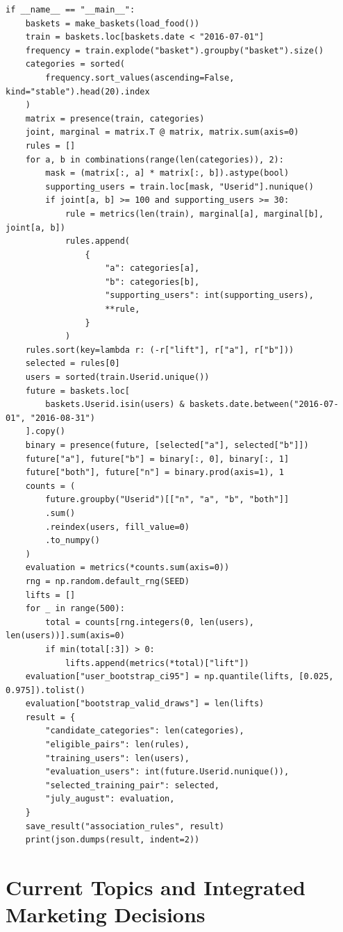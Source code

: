 \begin{Verbatim}[breaklines,breakanywhere,fontsize=\small]
if __name__ == "__main__":
    baskets = make_baskets(load_food())
    train = baskets.loc[baskets.date < "2016-07-01"]
    frequency = train.explode("basket").groupby("basket").size()
    categories = sorted(
        frequency.sort_values(ascending=False, kind="stable").head(20).index
    )
    matrix = presence(train, categories)
    joint, marginal = matrix.T @ matrix, matrix.sum(axis=0)
    rules = []
    for a, b in combinations(range(len(categories)), 2):
        mask = (matrix[:, a] * matrix[:, b]).astype(bool)
        supporting_users = train.loc[mask, "Userid"].nunique()
        if joint[a, b] >= 100 and supporting_users >= 30:
            rule = metrics(len(train), marginal[a], marginal[b], joint[a, b])
            rules.append(
                {
                    "a": categories[a],
                    "b": categories[b],
                    "supporting_users": int(supporting_users),
                    **rule,
                }
            )
    rules.sort(key=lambda r: (-r["lift"], r["a"], r["b"]))
    selected = rules[0]
    users = sorted(train.Userid.unique())
    future = baskets.loc[
        baskets.Userid.isin(users) & baskets.date.between("2016-07-01", "2016-08-31")
    ].copy()
    binary = presence(future, [selected["a"], selected["b"]])
    future["a"], future["b"] = binary[:, 0], binary[:, 1]
    future["both"], future["n"] = binary.prod(axis=1), 1
    counts = (
        future.groupby("Userid")[["n", "a", "b", "both"]]
        .sum()
        .reindex(users, fill_value=0)
        .to_numpy()
    )
    evaluation = metrics(*counts.sum(axis=0))
    rng = np.random.default_rng(SEED)
    lifts = []
    for _ in range(500):
        total = counts[rng.integers(0, len(users), len(users))].sum(axis=0)
        if min(total[:3]) > 0:
            lifts.append(metrics(*total)["lift"])
    evaluation["user_bootstrap_ci95"] = np.quantile(lifts, [0.025, 0.975]).tolist()
    evaluation["bootstrap_valid_draws"] = len(lifts)
    result = {
        "candidate_categories": len(categories),
        "eligible_pairs": len(rules),
        "training_users": len(users),
        "evaluation_users": int(future.Userid.nunique()),
        "selected_training_pair": selected,
        "july_august": evaluation,
    }
    save_result("association_rules", result)
    print(json.dumps(result, indent=2))
\end{Verbatim}

\hypertarget{M08-m8.-current-topics-and-integrated-marketing-decisions}{%
\chapter{Current Topics and Integrated Marketing
Decisions}\label{M08-m8.-current-topics-and-integrated-marketing-decisions}}

